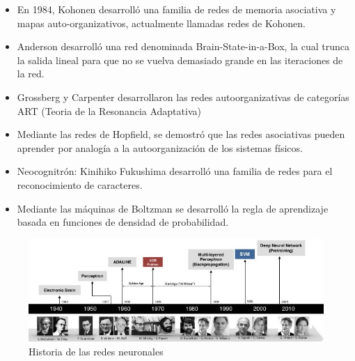 \begin{itemize}
\item En 1984, Kohonen desarrolló una familia de redes de memoria asociativa y mapas auto-organizativos, actualmente llamadas redes de Kohonen.
\item Anderson desarrolló una red denominada Brain-State-in-a-Box, la cual trunca la salida lineal para que no se vuelva demasiado grande en las iteraciones de la red.
\item Grossberg y Carpenter desarrollaron las redes autoorganizativas de categorías ART (Teoria de la Resonancia Adaptativa)
\item Mediante las redes de Hopfield, se demostró que las redes asociativas pueden aprender por analogía a la autoorganización de los sistemas físicos.
\item Neocognitrón: Kinihiko Fukushima desarrolló una familia de redes para el reconocimiento de caracteres.
\item Mediante las máquinas de Boltzman se desarrolló la regla de aprendizaje basada en funciones de densidad de probabilidad.
\end{itemize}

\begin{figure}[htp]
\centering
\includegraphics[scale=0.60]{images/history.jpg}
\caption{Historia de las redes neuronales}
\end{figure}

